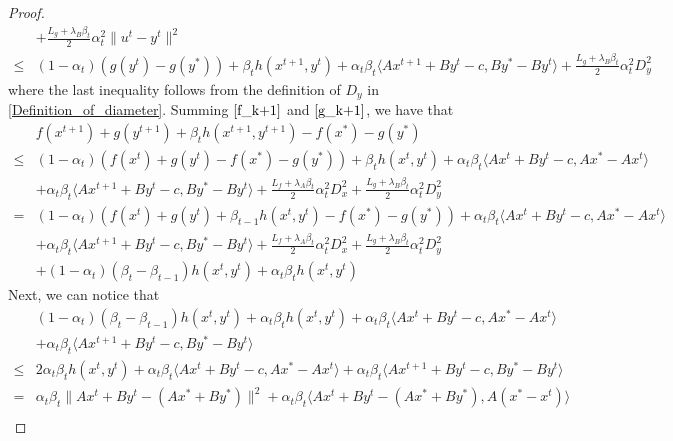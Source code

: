 \documentclass{article}
\numberwithin{equation}{section}
\begin{document}
\begin{proof}
\begin{align}
        &+\frac{L_g+\lambda_{B} \beta_t}{2} \alpha_t^2 \|u^t-y^t\rVert^2 \nonumber \\
        \leq& (1-\alpha_t)(g(y^t)-g(y^*))+\beta_{t}h(x^{t+1},y^t)+ \alpha_t\beta_{t}\langle Ax^{t+1} +By^t -c, By^* -By^t\rangle +\frac{L_g+\lambda_{B} \beta_t}{2} \alpha_t^2D_y^2
        \label{g_k+1}
    \end{align}
    where the last inequality follows from the definition of $D_y$ in \eqref{Definition_of_diameter}.  
    Summing $\eqref{f_k+1}$ and $\eqref{g_k+1}$, we have that 
    \begin{align}
        &f(x^{t+1}) +g(y^{t+1}) +\beta_{t}h(x^{t+1},y^{t+1}) -f(x^*) -g(y^*) \nonumber \\
        \leq& (1-\alpha_t)\left(f(x^t) +g(y^t) -f(x^*)-g(y^*)\right) +\beta_{t}h(x^t,y^t)+\alpha_t\beta_{t}\langle Ax^t+By^t-c,Ax^*-Ax^t\rangle \nonumber \\
        &+ \alpha_t\beta_{t}\langle Ax^{t+1} +By^t -c, By^* -By^t\rangle +\frac{L_f+\lambda_{A} \beta_{t}}{2}\alpha_t^2D_x^2+ \frac{L_g +\lambda_{B} \beta_{t}}{2}\alpha_t^2D_y^2 \nonumber \\
        =& (1-\alpha_t)\left(f(x^t) +g(y^t)+\beta_{t-1}h(x^t,y^t) -f(x^*)-g(y^*)\right)+\alpha_t\beta_{t}\langle Ax^t+By^t-c,Ax^*-Ax^t\rangle \nonumber \\
        &+ \alpha_t\beta_{t}\langle Ax^{t+1} +By^t -c, By^* -By^t\rangle +\frac{L_f+\lambda_{A} \beta_{t}}{2}\alpha_t^2D_x^2+ \frac{L_g +\lambda_{B} \beta_{t}}{2}\alpha_t^2D_y^2
        \nonumber \\
        & +(1-\alpha_t)(\beta_{t}-\beta_{t-1})h(x^t,y^t) + \alpha_t\beta_{t} h(x^t,y^t) \label{F_k-F_k+1}
    \end{align}
    Next, we can notice that  
    \begin{align}
        &(1-\alpha_t)(\beta_{t}-\beta_{t-1})h(x^t,y^t) + \alpha_t\beta_{t}h(x^t,y^t) + \alpha_t\beta_{t}\langle Ax^t+By^t-c,Ax^*-Ax^t\rangle \nonumber \\
        &+ \alpha_t\beta_{t}\langle Ax^{t+1} +By^t -c, By^* -By^t\rangle \nonumber \\
        \overset{\mathop{(a)}}{\leq}& 2\alpha_t\beta_{t} h(x^t,y^t) + \alpha_t\beta_{t}\langle Ax^t+By^t-c,Ax^*-Ax^t\rangle+ \alpha_t\beta_{t}\langle Ax^{t+1} +By^t -c, By^* -By^t\rangle \nonumber \\
        \overset{\mathop{(b)}}{=}& \alpha_t\beta_t\|Ax^t+By^t-(Ax^*+ By^*)\rVert^2 +\alpha_t\beta_{t} \langle Ax^{t} +By^t-(Ax^*+By^*),A(x^*-x^t) \rangle \nonumber\\

\end{align}
\end{proof}
\end{document}

